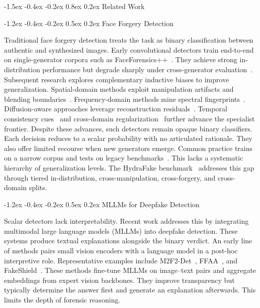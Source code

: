 \documentclass[10pt,twocolumn,letterpaper]{article}
\makeatletter
\renewcommand\section{\@startsection{section}{1}{\z@}%
  {-1.5ex \@plus -0.4ex \@minus -0.2ex}%
  {0.8ex \@plus 0.2ex}%
  {\normalfont\large\bfseries}}
\renewcommand\subsection{\@startsection{subsection}{2}{\z@}%
  {-1.2ex \@plus -0.4ex \@minus -0.2ex}%
  {0.5ex \@plus 0.2ex}%
  {\normalfont\normalsize\bfseries}}
\makeatother
\begin{document}
\section{Related Work}
\label{sec:related}

\subsection{Face Forgery Detection}

Traditional face forgery detection treats the task as binary classification between authentic and synthesized images. Early convolutional detectors train end-to-end on single-generator corpora such as FaceForensics++~\cite{cnndet,faceforensics}. They achieve strong in-distribution performance but degrade sharply under cross-generator evaluation~\cite{deepfake_survey}. Subsequent research explores complementary inductive biases to improve generalization. Spatial-domain methods exploit manipulation artifacts and blending boundaries~\cite{sbi,npr}. Frequency-domain methods mine spectral fingerprints~\cite{f3net,freqblender,srm}. Diffusion-aware approaches leverage reconstruction residuals~\cite{dire}. Temporal consistency cues~\cite{lipforensics} and cross-domain regularization~\cite{ucf} further advance the specialist frontier. Despite these advances, such detectors remain opaque binary classifiers. Each decision reduces to a scalar probability with no articulated rationale. They also offer limited recourse when new generators emerge. Common practice trains on a narrow corpus and tests on legacy benchmarks~\cite{faceforensics}. This lacks a systematic hierarchy of generalization levels. The HydraFake benchmark~\cite{veritas} addresses this gap through tiered in-distribution, cross-manipulation, cross-forgery, and cross-domain splits.

\subsection{MLLMs for Deepfake Detection}

Scalar detectors lack interpretability. Recent work addresses this by integrating multimodal large language models (MLLMs) into deepfake detection. These systems produce textual explanations alongside the binary verdict. An early line of methods pairs small vision encoders with a language model in a post-hoc interpretive role. Representative examples include M2F2-Det~\cite{m2f2det}, FFAA~\cite{ffaa}, and FakeShield~\cite{fakeshield}. These methods fine-tune MLLMs on image--text pairs and aggregate embeddings from expert vision backbones. They improve transparency but typically determine the answer first and generate an explanation afterwards. This limits the depth of forensic reasoning.
\end{document}
